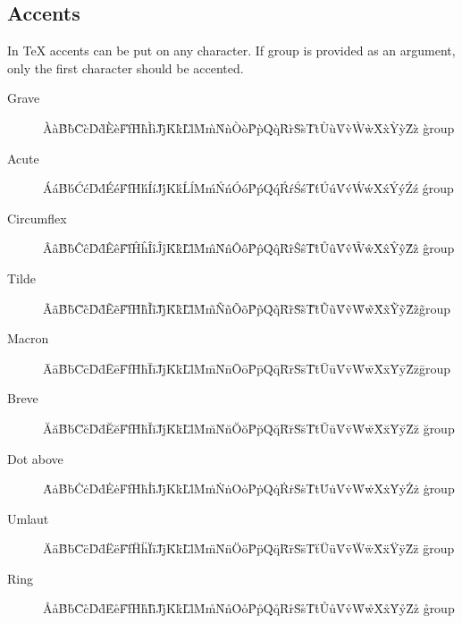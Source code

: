 \documentclass[11pt]{article}
\begin{document}
\subsection{Accents}
In \TeX{} accents can be put on any character. If group is provided as an argument, only the first character should be accented.
\begin{description}
    \item[Grave] \`A\`a\`B\`b\`C\`c\`D\`d\`E\`e\`F\`f\`H\`h\`I\`i\`J\`j\`K\`k\`L\`l\`M\`m\`N\`n\`O\`o\`P\`p\`Q\`q\`R\`r\`S\`s\`T\`t\`U\`u\`V\`v\`W\`w\`X\`x\`Y\`y\`Z\`z \`{group}

    \item[Acute] \'A\'a\'B\'b\'C\'c\'D\'d\'E\'e\'F\'f\'H\'h\'I\'i\'J\'j\'K\'k\'L\'l\'M\'m\'N\'n\'O\'o\'P\'p\'Q\'q\'R\'r\'S\'s\'T\'t\'U\'u\'V\'v\'W\'w\'X\'x\'Y\'y\'Z\'z \'{group}

    \item[Circumflex]  \^A\^a\^B\^b\^C\^c\^D\^d\^E\^e\^F\^f\^H\^h\^I\^i\^J\^j\^K\^k\^L\^l\^M\^m\^N\^n\^O\^o\^P\^p\^Q\^q\^R\^r\^S\^s\^T\^t\^U\^u\^V\^v\^W\^w\^X\^x\^Y\^y\^Z\^z \^{group}

    \item[Tilde]\~A\~a\~B\~b\~C\~c\~D\~d\~E\~e\~F\~f\~H\~h\~I\~i\~J\~j\~K\~k\~L\~l\~M\~m\~N\~n\~O\~o\~P\~p\~Q\~q\~R\~r\~S\~s\~T\~t\~U\~u\~V\~v\~W\~w\~X\~x\~Y\~y\~Z\~z\~{group}

    \item[Macron]\=A\=a\=B\=b\=C\=c\=D\=d\=E\=e\=F\=f\=H\=h\=I\=i\=J\=j\=K\=k\=L\=l\=M\=m\=N\=n\=O\=o\=P\=p\=Q\=q\=R\=r\=S\=s\=T\=t\=U\=u\=V\=v\=W\=w\=X\=x\=Y\=y\=Z\=z\={group}

    \item[Breve]  \u A\u a\u B\u b\u C\u c\u D\u d\u E\u e\u F\u f\u H\u h\u I\u i\u J\u j\u K\u k\u L\u l\u M\u m\u N\u n\u O\u o\u P\u p\u Q\u q\u R\u r\u S\u s\u T\u t\u U\u u\u V\u v\u W\u w\u X\u x\u Y\u y\u Z\u z \u {group}

    \item[Dot above]  \.A\.a\.B\.b\.C\.c\.D\.d\.E\.e\.F\.f\.H\.h\.I\.i\.J\.j\.K\.k\.L\.l\.M\.m\.N\.n\.O\.o\.P\.p\.Q\.q\.R\.r\.S\.s\.T\.t\.U\.u\.V\.v\.W\.w\.X\.x\.Y\.y\.Z\.z \.{group}

    \item[Umlaut]  \"A\"a\"B\"b\"C\"c\"D\"d\"E\"e\"F\"f\"H\"h\"I\"i\"J\"j\"K\"k\"L\"l\"M\"m\"N\"n\"O\"o\"P\"p\"Q\"q\"R\"r\"S\"s\"T\"t\"U\"u\"V\"v\"W\"w\"X\"x\"Y\"y\"Z\"z \"{group}

    \item[Ring]  \r A\r a\r B\r b\r C\r c\r D\r d\r E\r e\r F\r f\r H\r h\r I\r i\r J\r j\r K\r k\r L\r l\r M\r m\r N\r n\r O\r o\r P\r p\r Q\r q\r R\r r\r S\r s\r T\r t\r U\r u\r V\r v\r W\r w\r X\r x\r Y\r y\r Z\r z \r{group}


\end{description}
\end{document}
